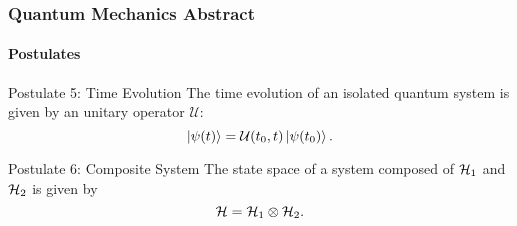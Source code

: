 \begin{frame}
    \frametitle{Quantum Mechanics Abstract}
    \framesubtitle{Postulates}

    \begin{block}{Postulate 5: Time Evolution}
        The time evolution of an isolated quantum system is given by an unitary operator
        $\mathcal{U}$:
        \begin{equation*}
            \ket{\psi(t)}=\mathcal{U}(t_0,t)\ket{\psi(t_0)}.
        \end{equation*}
    \end{block}
    \begin{block}{Postulate 6: Composite System}
        The state space of a system composed of $\mathcal{H}_1$ and $\mathcal{H}_2$ is given by
        \begin{equation*}
            \mathcal{H}=\mathcal{H}_1\otimes\mathcal{H}_2.
        \end{equation*}
    \end{block}

\end{frame}